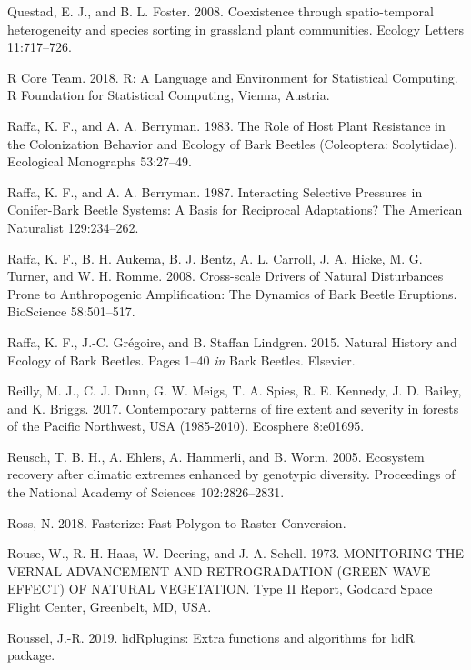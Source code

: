 \documentclass[twoside,12pt,final]{ucthesis-CA2012}
\begin{document}
\begin{ucmainmatter}
\hypertarget{ref-questad2008}{}
Questad, E. J., and B. L. Foster. 2008. Coexistence through
spatio-temporal heterogeneity and species sorting in grassland plant
communities. Ecology Letters 11:717--726.

\hypertarget{ref-rcoreteam2018}{}
R Core Team. 2018. R: A Language and Environment for Statistical
Computing. R Foundation for Statistical Computing, Vienna, Austria.

\hypertarget{ref-raffa1983}{}
Raffa, K. F., and A. A. Berryman. 1983. The Role of Host Plant
Resistance in the Colonization Behavior and Ecology of Bark Beetles
(Coleoptera: Scolytidae). Ecological Monographs 53:27--49.

\hypertarget{ref-raffa1987}{}
Raffa, K. F., and A. A. Berryman. 1987. Interacting Selective Pressures
in Conifer-Bark Beetle Systems: A Basis for Reciprocal Adaptations? The
American Naturalist 129:234--262.

\hypertarget{ref-raffa2008}{}
Raffa, K. F., B. H. Aukema, B. J. Bentz, A. L. Carroll, J. A. Hicke, M.
G. Turner, and W. H. Romme. 2008. Cross-scale Drivers of Natural
Disturbances Prone to Anthropogenic Amplification: The Dynamics of Bark
Beetle Eruptions. BioScience 58:501--517.

\hypertarget{ref-raffa2015}{}
Raffa, K. F., J.-C. Grégoire, and B. Staffan Lindgren. 2015. Natural
History and Ecology of Bark Beetles. Pages 1--40 \emph{in} Bark Beetles.
Elsevier.

\hypertarget{ref-reilly2017}{}
Reilly, M. J., C. J. Dunn, G. W. Meigs, T. A. Spies, R. E. Kennedy, J.
D. Bailey, and K. Briggs. 2017. Contemporary patterns of fire extent and
severity in forests of the Pacific Northwest, USA (1985-2010). Ecosphere
8:e01695.

\hypertarget{ref-reusch2005}{}
Reusch, T. B. H., A. Ehlers, A. Hammerli, and B. Worm. 2005. Ecosystem
recovery after climatic extremes enhanced by genotypic diversity.
Proceedings of the National Academy of Sciences 102:2826--2831.

\hypertarget{ref-ross2018}{}
Ross, N. 2018. Fasterize: Fast Polygon to Raster Conversion.

\hypertarget{ref-rouse1973}{}
Rouse, W., R. H. Haas, W. Deering, and J. A. Schell. 1973. MONITORING
THE VERNAL ADVANCEMENT AND RETROGRADATION (GREEN WAVE EFFECT) OF NATURAL
VEGETATION. Type II Report, Goddard Space Flight Center, Greenbelt, MD,
USA.

\hypertarget{ref-roussel2019a}{}
Roussel, J.-R. 2019. lidRplugins: Extra functions and algorithms for
lidR package.


\end{ucmainmatter}
\end{document}
